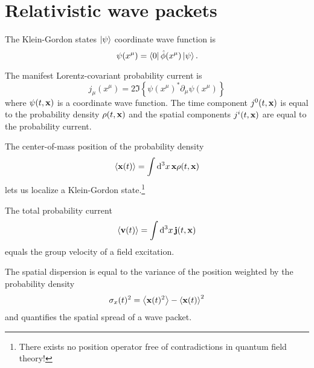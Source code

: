 \section{Relativistic wave packets}

\begin{definition}
	The Klein-Gordon states $\ket{\psi}$ coordinate wave function is
	\begin{equation}
		\psi(x^\mu)
		=
		\bra{0}
		\hat\phi(x^\mu)
		\ket{\psi}
		.
	\end{equation}
\end{definition}
\begin{definition}
	The manifest Lorentz-covariant probability current is
	\begin{equation}
		j_\mu(x^\mu)
		=
		2
		\Im\left\{
			\psi(x^\mu)^*
			\partial_\mu
			\psi(x^\mu)
		\right\}
		\label{eq:qkg_probability_current}
	\end{equation}
	where $\psi(t,\vb{x})$ is a coordinate wave function.
	The time component $j^0(t,\vb{x})$ is equal to the probability density $\rho(t,\vb{x})$ and the spatial components $j^i(t,\vb{x})$ are equal to the probability current.
\end{definition}
\begin{definition}[Localization]
	The center-of-mass position of the probability density
	\begin{equation}
		\expval{\vb{x}(t)}
		=
		\int\dd[3]{x}
		\vb{x}
		\rho(t,\vb{x})
	\end{equation}
	lets us localize a Klein-Gordon state.\footnote{There exists no position operator free of contradictions in quantum field theory!}
\end{definition}
\begin{definition}
	The total probability current
	\begin{equation}
		\expval{\vb{v}(t)}
		=
		\int\dd[3]{x}
		\vb{j}(t,\vb{x})
		\label{eq:group_velocity}
	\end{equation}
	equals the group velocity of a field excitation.
\end{definition}
\begin{definition}
	The spatial dispersion is equal to the variance of the position weighted by the probability density
	\begin{equation}
		\sigma_x(t)^2
		=
		\expval{\vb{x}(t)^2}
		-
		\expval{\vb{x}(t)}^2
	\end{equation}
	and quantifies the spatial spread of a wave packet.
\end{definition}
